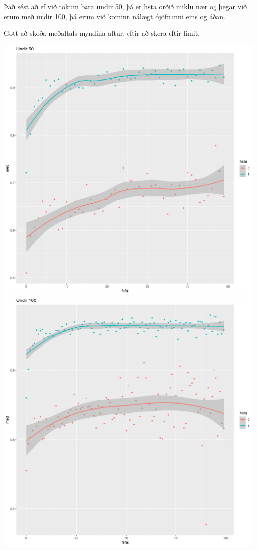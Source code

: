 \documentclass[
]{article}
\begin{document}
Það sést að ef við tökum bara undir 50, þá er hsta orðið miklu nær og þegar við erum með undir 100, þá erum við kominn nálægt ójöfnunni eins og áðan.

Gott að skoða meðaltals myndina aftur, eftir að skera eftir limit.

\includegraphics{Imgsimplify/plotbymean50.png}
\includegraphics{Imgsimplify/plotbymean100.png}
\end{document}
